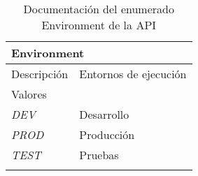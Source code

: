 \begin{longtable}{|p{} p{}|}
    \hline
    \multicolumn{2}{|l|}{\textbf{Environment}} \\ \hline \hline
    Descripción      & Entornos de ejecución \\ \hline
    \multicolumn{2}{|l|}{Valores} \\
    \emph{DEV}  & Desarrollo  \\
    \emph{PROD}  & Producción  \\
    \emph{TEST}  & Pruebas  \\ \hline
    \caption{Documentación del enumerado Environment de la API}
    \label{dis:api:environment}
\end{longtable}